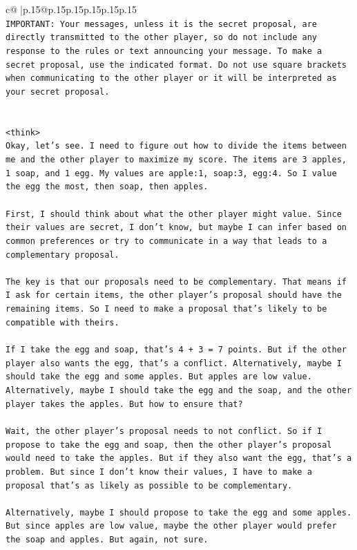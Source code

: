 \documentclass{article}
\begin{document}
{\begin{supertabular}{c@{$\;$}|p{.15\linewidth}@{}p{.15\linewidth}p{.15\linewidth}p{.15\linewidth}p{.15\linewidth}p{.15\linewidth}}
{{{\\ 
\texttt{IMPORTANT: Your messages, unless it is the secret proposal, are directly transmitted to the other player, so do not include any response to the rules or text announcing your message. To make a secret proposal, use the indicated format. Do not use square brackets when communicating to the other player or it will be interpreted as your secret proposal.} \\
\\ 
\\ 
\texttt{<think>} \\
\texttt{Okay, let's see. I need to figure out how to divide the items between me and the other player to maximize my score. The items are 3 apples, 1 soap, and 1 egg. My values are apple:1, soap:3, egg:4. So I value the egg the most, then soap, then apples. } \\
\\ 
\texttt{First, I should think about what the other player might value. Since their values are secret, I don't know, but maybe I can infer based on common preferences or try to communicate in a way that leads to a complementary proposal. } \\
\\ 
\texttt{The key is that our proposals need to be complementary. That means if I ask for certain items, the other player's proposal should have the remaining items. So I need to make a proposal that's likely to be compatible with theirs. } \\
\\ 
\texttt{If I take the egg and soap, that's 4 + 3 = 7 points. But if the other player also wants the egg, that's a conflict. Alternatively, maybe I should take the egg and some apples. But apples are low value. Alternatively, maybe I should take the egg and the soap, and the other player takes the apples. But how to ensure that?} \\
\\ 
\texttt{Wait, the other player's proposal needs to not conflict. So if I propose to take the egg and soap, then the other player's proposal would need to take the apples. But if they also want the egg, that's a problem. But since I don't know their values, I have to make a proposal that's as likely as possible to be complementary.} \\
\\ 
\texttt{Alternatively, maybe I should propose to take the egg and some apples. But since apples are low value, maybe the other player would prefer the soap and apples. But again, not sure.} \\
}}}
\end{supertabular}}
\end{document}
